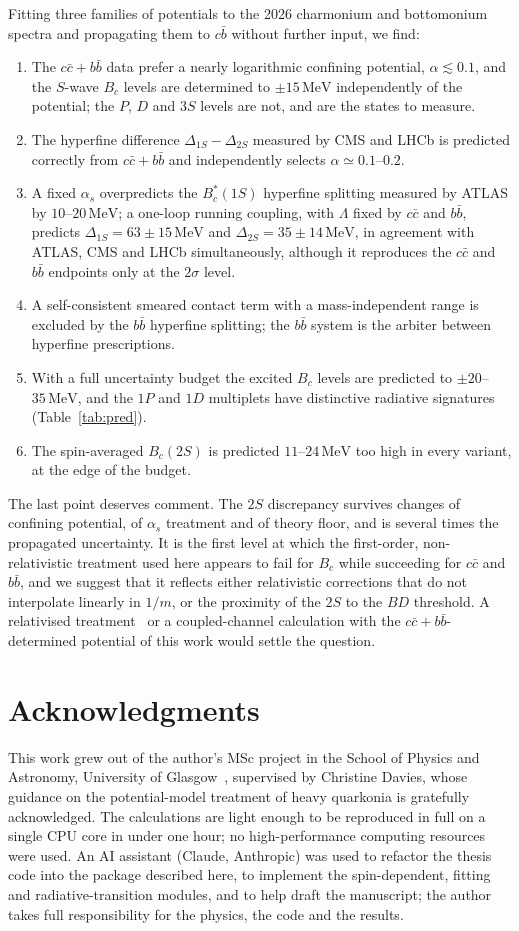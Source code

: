 \documentclass[10pt,twocolumn]{article}
\newenvironment{acknowledgments}{\section*{Acknowledgments}}{}
\newcommand{\Bc}{B_c}
\newcommand{\Bcs}{B_c^*}
\newcommand{\cc}{c\bar c}
\newcommand{\bb}{b\bar b}
\newcommand{\cb}{c\bar b}
\newcommand{\MeV}{\,\mathrm{MeV}}
\begin{document}
Fitting three families of potentials to the 2026 charmonium and bottomonium spectra and propagating them to $\cb$ without further input, we find:
\begin{enumerate}
\item The $\cc+\bb$ data prefer a nearly logarithmic confining potential, $\alpha\lesssim0.1$, and the $S$-wave $\Bc$ levels are determined to $\pm15\MeV$ independently of the potential; the $P$, $D$ and $3S$ levels are not, and are the states to measure.
\item The hyperfine difference $\Delta_{1S}-\Delta_{2S}$ measured by CMS and LHCb is predicted correctly from $\cc+\bb$ and independently selects $\alpha\simeq0.1$--$0.2$.
\item A fixed $\alpha_s$ overpredicts the $\Bcs(1S)$ hyperfine splitting measured by ATLAS by $10$--$20\MeV$; a one-loop running coupling, with $\Lambda$ fixed by $\cc$ and $\bb$, predicts $\Delta_{1S}=63\pm15\MeV$ and $\Delta_{2S}=35\pm14\MeV$, in agreement with ATLAS, CMS and LHCb simultaneously, although it reproduces the $\cc$ and $\bb$ endpoints only at the $2\sigma$ level.
\item A self-consistent smeared contact term with a mass-independent range is excluded by the $\bb$ hyperfine splitting; the $\bb$ system is the arbiter between hyperfine prescriptions.
\item With a full uncertainty budget the excited $\Bc$ levels are predicted to $\pm20$--$35\MeV$, and the $1P$ and $1D$ multiplets have distinctive radiative signatures (Table~\ref{tab:pred}).
\item The spin-averaged $\Bc(2S)$ is predicted $11$--$24\MeV$ too high in every variant, at the edge of the budget.
\end{enumerate}
The last point deserves comment.
The $2S$ discrepancy survives changes of confining potential, of $\alpha_s$ treatment and of theory floor, and is several times the propagated uncertainty.
It is the first level at which the first-order, non-relativistic treatment used here appears to fail for $\Bc$ while succeeding for $\cc$ and $\bb$, and we suggest that it reflects either relativistic corrections that do not interpolate linearly in $1/m$, or the proximity of the $2S$ to the $BD$ threshold.
A relativised treatment~\cite{Godfrey2004} or a coupled-channel calculation with the $\cc+\bb$-determined potential of this work would settle the question.

\begin{acknowledgments}
This work grew out of the author's MSc project in the School of Physics and Astronomy, University of Glasgow~\cite{OppongThesis}, supervised by Christine Davies, whose guidance on the potential-model treatment of heavy quarkonia is gratefully acknowledged.
The calculations are light enough to be reproduced in full on a single CPU core in under one hour; no high-performance computing resources were used.
An AI assistant (Claude, Anthropic) was used to refactor the thesis code into the package described here, to implement the spin-dependent, fitting and radiative-transition modules, and to help draft the manuscript; the author takes full responsibility for the physics, the code and the results.
\end{acknowledgments}
\end{document}
